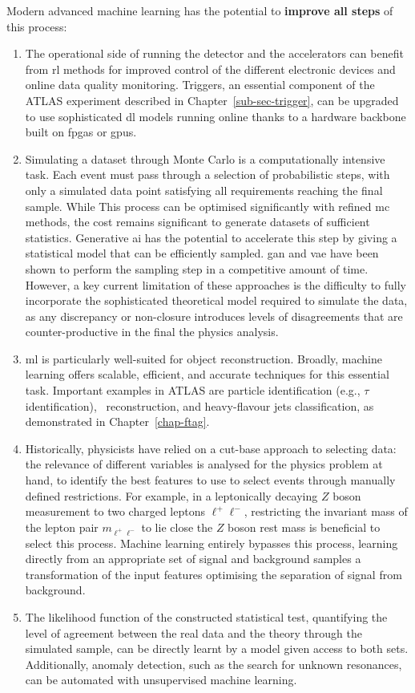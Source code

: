 Modern advanced machine learning has the potential to \textbf{improve all steps} of this process:
\begin{enumerate}
    \item The operational side of running the detector and the accelerators can benefit from \gls{rl} methods for improved control of the different electronic devices and online data quality monitoring. Triggers, an essential component of the ATLAS experiment described in Chapter~\ref{sub-sec-trigger}, can be upgraded to use sophisticated \gls{dl} models running online thanks to a hardware backbone built on \glspl{fpga} or \glspl{gpu}.
    \item Simulating a dataset through Monte Carlo is a computationally intensive task. Each event must pass through a selection of probabilistic steps, with only a simulated data point satisfying all requirements reaching the final sample. While This process can be optimised significantly with refined \gls{mc} methods, the cost remains significant to generate datasets of sufficient statistics. Generative \gls{ai} has the potential to accelerate this step by giving a statistical model that can be efficiently sampled. \gls{gan} and \gls{vae} have been shown to perform the sampling step in a competitive amount of time. However, a key current limitation of these approaches is the difficulty to fully incorporate the sophisticated theoretical model required to simulate the data, as any discrepancy or non-closure introduces levels of disagreements that are counter-productive in the final the physics analysis.
    \item \gls{ml} is particularly well-suited for object reconstruction. Broadly, machine learning offers scalable, efficient, and accurate techniques for this essential task. Important examples in ATLAS are particle identification (e.g., $\tau$ identification), \etm\ reconstruction, and heavy-flavour jets classification, as demonstrated in Chapter~\ref{chap-ftag}.
    \item Historically, physicists have relied on a cut-base approach to selecting data: the relevance of different variables is analysed for the physics problem at hand, to identify the best features to use to select events through manually defined restrictions. For example, in a leptonically decaying $Z$ boson measurement to two charged leptons $\ell^+\ell^-$, restricting the invariant mass of the lepton pair $m_{\ell^+\ell^-}$ to lie close the $Z$ boson rest mass is beneficial to select this process. Machine learning entirely bypasses this process, learning directly from an appropriate set of signal and background samples a transformation of the input features optimising the separation of signal from background. 
    \item The likelihood function of the constructed statistical test, quantifying the level of agreement between the real data and the theory through the simulated sample, can be directly learnt by a model given access to both sets. Additionally, anomaly detection, such as the search for unknown resonances, can be automated with unsupervised machine learning. 
\end{enumerate}

